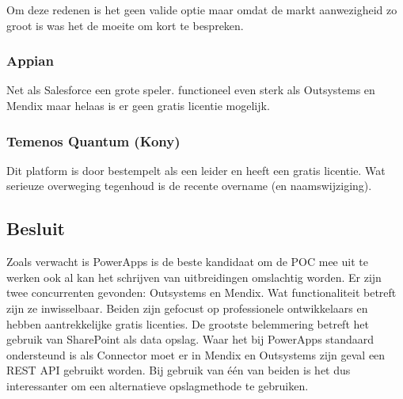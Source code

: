 Om deze redenen is het geen valide optie maar omdat de markt aanwezigheid zo groot is was het de moeite om kort te bespreken.

\subsubsection{Appian}

Net als Salesforce een grote speler. functioneel even sterk als Outsystems en Mendix maar helaas is er geen gratis licentie mogelijk.

\subsubsection{Temenos Quantum (Kony)}

Dit platform is door \textcite{Vincent2019} bestempelt als een leider en heeft een gratis licentie. Wat serieuze overweging tegenhoud is de recente overname (en naamswijziging).

\subsection{Besluit}

Zoals verwacht is PowerApps is de beste kandidaat om de POC mee uit te werken ook al kan het schrijven van uitbreidingen omslachtig worden. Er zijn twee concurrenten gevonden: Outsystems en Mendix. Wat functionaliteit betreft zijn ze inwisselbaar. Beiden zijn gefocust op professionele ontwikkelaars en hebben aantrekkelijke gratis licenties. De grootste belemmering betreft het gebruik van SharePoint als data opslag. Waar het bij PowerApps standaard ondersteund is als Connector moet er in Mendix en Outsystems zijn geval een REST API gebruikt worden. Bij gebruik van één van beiden is het dus interessanter om een alternatieve opslagmethode te gebruiken.


